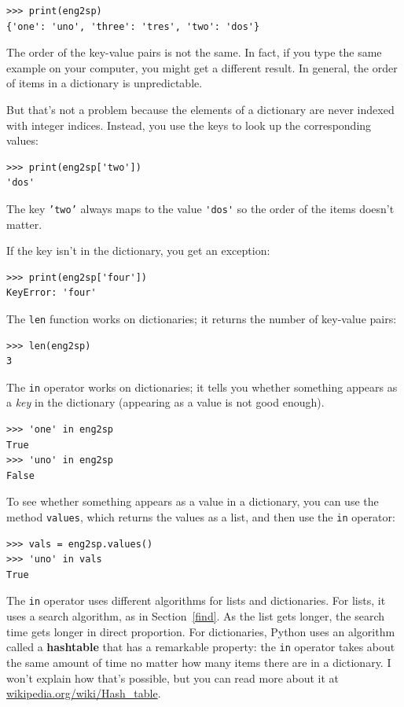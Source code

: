 \documentclass[10pt]{book}
\begin{document}
\beforeverb
\begin{verbatim}
>>> print(eng2sp)
{'one': 'uno', 'three': 'tres', 'two': 'dos'}
\end{verbatim}
\afterverb
%
The order of the key-value pairs is not the same.  In fact, if
you type the same example on your computer, you might get a
different result.  In general, the order of items in
a dictionary is unpredictable.

But that's not a problem because
the elements of a dictionary are never indexed with integer indices.
Instead, you use the keys to look up the corresponding values:

\beforeverb
\begin{verbatim}
>>> print(eng2sp['two'])
'dos'
\end{verbatim}
\afterverb
%
The key {\tt 'two'} always maps to the value \verb"'dos'" so the order
of the items doesn't matter.

If the key isn't in the dictionary, you get an exception:


\beforeverb
\begin{verbatim}
>>> print(eng2sp['four'])
KeyError: 'four'
\end{verbatim}
\afterverb
%
The {\tt len} function works on dictionaries; it returns the
number of key-value pairs:


\beforeverb
\begin{verbatim}
>>> len(eng2sp)
3
\end{verbatim}
\afterverb
%
The {\tt in} operator works on dictionaries; it tells you whether
something appears as a {\em key} in the dictionary (appearing
as a value is not good enough).


\beforeverb
\begin{verbatim}
>>> 'one' in eng2sp
True
>>> 'uno' in eng2sp
False
\end{verbatim}
\afterverb
%
To see whether something appears as a value in a dictionary, you
can use the method {\tt values}, which returns the values as
a list, and then use the {\tt in} operator:


\beforeverb
\begin{verbatim}
>>> vals = eng2sp.values()
>>> 'uno' in vals
True
\end{verbatim}
\afterverb
%
The {\tt in} operator uses different algorithms for lists and
dictionaries.  For lists, it uses a search algorithm, as in
Section~\ref{find}.  As the list gets longer, the search time gets
longer in direct proportion.  For dictionaries, Python uses an
algorithm called a {\bf hashtable} that has a remarkable property: the
{\tt in} operator takes about the same amount of time no matter how
many items there are in a dictionary.  I won't explain how that's
possible, but you can read more about it at
\url{wikipedia.org/wiki/Hash_table}.
\end{document}
